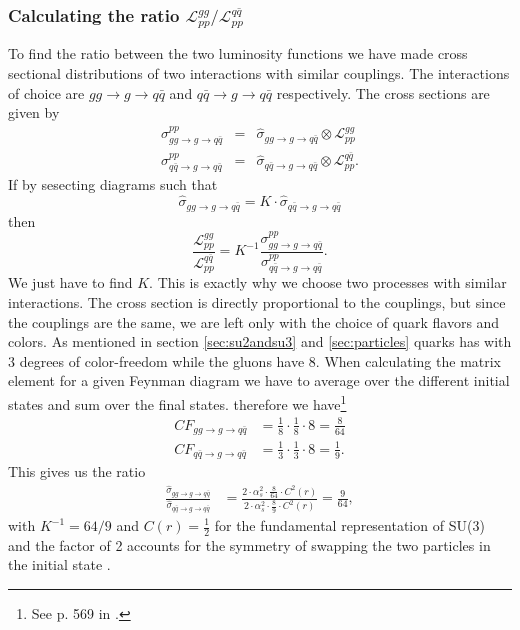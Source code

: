 \subsubsection{Calculating the ratio ${\mathcal{L}_{pp}^{gg}}/{\mathcal{L}_{pp}^{q \bar q}}$}
To find the ratio between the two luminosity functions we have made cross sectional distributions of two interactions with similar couplings. The interactions of choice are  $gg \rightarrow g \rightarrow q \bar q$ and $q \bar q \rightarrow g \rightarrow q \bar q$ respectively. The cross sections are given by  
\begin{eqnarray}
\sigma^{pp}_{gg \rightarrow g \rightarrow q \bar q}&=&\hat \sigma_{gg \rightarrow g \rightarrow q \bar q} \otimes \mathcal{L}_{pp}^{gg} \\
\sigma^{pp}_{q \bar q \rightarrow g \rightarrow q \bar q}&=& \hat \sigma_{q \bar q \rightarrow g \rightarrow q \bar q} \otimes \mathcal{L}_{pp}^{q \bar q}.
\end{eqnarray}
If by sesecting diagrams such that
\begin{equation}
\hat \sigma_{gg \rightarrow g \rightarrow q \bar q} = K \cdot \hat \sigma_{q \bar q \rightarrow g \rightarrow q \bar q} 
\end{equation}
then
\begin{equation}
\frac{\mathcal{L}_{pp}^{gg}}{\mathcal{L}_{pp}^{q \bar q}} = K^{-1} \frac{\sigma^{pp}_{gg \rightarrow g \rightarrow q \bar q}}{\sigma^{pp}_{q \bar q \rightarrow g \rightarrow q \bar q}}. 
\end{equation}
We just have to find $K$. This is exactly why we choose two processes with similar interactions. The cross section is directly proportional to the couplings, but since the couplings are the same, we are left only with the choice of quark flavors and colors. As mentioned in section \ref{sec:su2andsu3} and \ref{sec:particles} quarks has with 3 degrees of color-freedom while the gluons have 8. When calculating the matrix element for a given Feynman diagram we have to average over the different initial states and sum over the final states. therefore we have\footnote{See p. 569 in  \cite{peskin1993iqf}.}
\begin{align}
	CF_{gg \rightarrow g \rightarrow q \bar q}&=\frac{1}{8} \cdot \frac{1}{8} \cdot 8=\frac{8}{64}\\
	CF_{q \bar q \rightarrow g \rightarrow q \bar q}&=\frac{1}{3} \cdot \frac{1}{3} \cdot 8=\frac{1}{9}.
\end{align}
This gives us the ratio
\begin{align}
	\frac{\hat \sigma_{gg \rightarrow g \rightarrow q \bar q}}{\hat \sigma_{q \bar q \rightarrow g \rightarrow q \bar q}} &=\frac{2 \cdot \alpha_{s}^2 \cdot \frac{8}{64} \cdot C^{2}(r)}{2 \cdot \alpha_{s}^2 \cdot \frac{8}{9} \cdot C^{2}(r)}=\frac{9}{64},
\end{align}
with $K^{-1}=64/9$ and $C(r) = \frac{1}{2}$ for the fundamental representation of SU(3) and the factor of 2 accounts for the symmetry of swapping the two particles in the initial state \cite{peskin1993iqf}.

